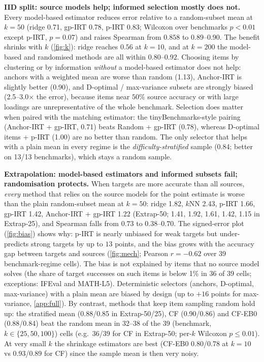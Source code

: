 \textbf{IID split: source models help; informed selection mostly does not.}
Every model-based estimator reduces error relative to a random-subset mean at $k=50$ (ridge 0.71, gp-IRT 0.78, p-IRT 0.83; Wilcoxon over benchmarks $p<0.01$ except p-IRT, $p=0.07$) and raises Spearman from $0.858$ to $0.89$--$0.90$. The benefit shrinks with $k$ (\cref{fig:k}): ridge reaches $0.56$ at $k=10$, and at $k=200$ the model-based and randomised methods are all within $0.80$--$0.92$. Choosing items by clustering or by information \emph{without} a model-based estimator does not help: anchors with a weighted mean are worse than random (1.13), Anchor-IRT is slightly better (0.90), and D-optimal / max-variance subsets are strongly biased (2.5--3.0$\times$ the error), because items near $50\%$ source accuracy or with large loadings are unrepresentative of the whole benchmark. Selection does matter when paired with the matching estimator: the tinyBenchmarks-style pairing (Anchor-IRT + gp-IRT, 0.71) beats Random + gp-IRT (0.78), whereas D-optimal items + p-IRT (1.00) are no better than random. The only selector that helps with a plain mean in every regime is the \emph{difficulty-stratified} sample (0.84; better on 13/13 benchmarks), which stays a random sample.

\textbf{Extrapolation: model-based estimators and informed subsets fail; randomisation protects.}
When targets are more accurate than all sources, \emph{every} method that relies on the source models for the point estimate is worse than the plain random-subset mean at $k=50$: ridge 1.82, $k$NN 2.43, p-IRT 1.66, gp-IRT 1.42, Anchor-IRT + gp-IRT 1.22 (Extrap-50; 1.41, 1.92, 1.61, 1.42, 1.15 in Extrap-25), and Spearman falls from $0.73$ to $0.38$--$0.70$. The signed-error plot (\cref{fig:bias}) shows why: p-IRT is nearly unbiased for weak targets but under-predicts strong targets by up to $13$ points, and the bias grows with the accuracy gap between targets and sources (\cref{fig:mech}; Pearson $r=-0.62$ over 39 benchmark-regime cells). The bias is not explained by items that no source model solves (the share of target successes on such items is below 1\% in 36 of 39 cells; exceptions: IFEval and MATH-L5). Deterministic selectors (anchors, D-optimal, max-variance) with a plain mean are biased by design (up to $+16$ points for max-variance, \cref{app:full}).
By contrast, methods that keep item sampling random hold up: the stratified mean (0.88/0.85 in Extrap-50/25), CF (0.90/0.86) and CF-EB0 (0.88/0.84) beat the random mean in 32--38 of the 39 (benchmark, $k\in\{25,50,100\}$) cells (e.g.\ 36/39 for CF in Extrap-50; per-$k$ Wilcoxon $p\le0.01$). At very small $k$ the shrinkage estimators are best (CF-EB0 0.80/0.78 at $k=10$ vs 0.93/0.89 for CF) since the sample mean is then very noisy.

